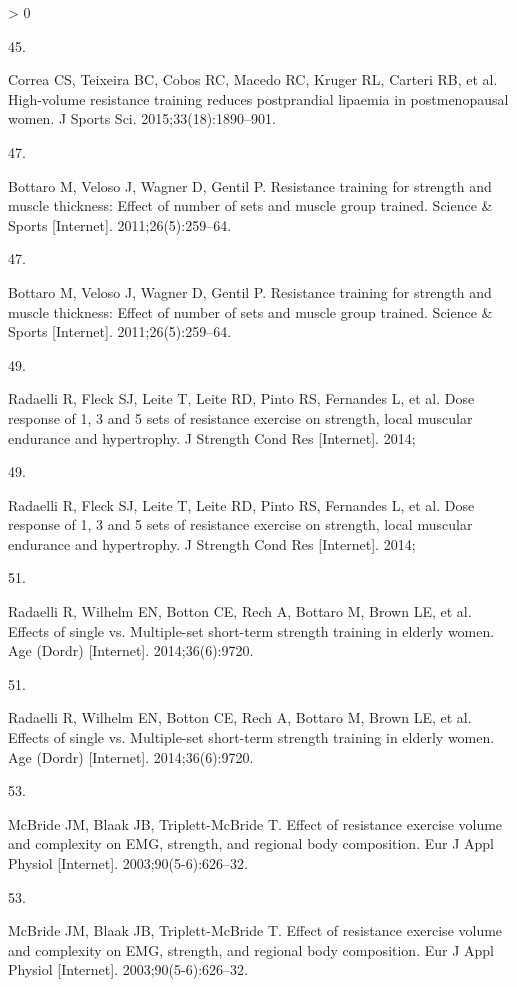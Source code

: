 \documentclass[twoside,10pt]{gihclass} %
\newlength{\cslhangindent}
\newlength{\csllabelwidth}
\newenvironment{CSLReferences}[3] %
 {%
  \setlength{\parindent}{0pt}
  \ifodd #1 \everypar{\setlength{\hangindent}{\cslhangindent}}\ignorespaces\fi
  \ifnum #2 > 0
  \setlength{\parskip}{#2\baselineskip}
  \fi
 }%
 {}
\newcommand{\CSLLeftMargin}[1]{\parbox[t]{\maxof{\widthof{#1}}{\csllabelwidth}}{#1}}
\newcommand{\CSLRightInline}[1]{\parbox[t]{\linewidth}{#1}}
\begin{document}
\begin{CSLReferences}{0}{0}
\leavevmode\hypertarget{ref-RN2464}{}%
\CSLLeftMargin{45. }
\CSLRightInline{Correa CS, Teixeira BC, Cobos RC, Macedo RC, Kruger RL, Carteri RB, et al. High-volume resistance training reduces postprandial lipaemia in postmenopausal women. J Sports Sci. 2015;33(18):1890--901. }

\leavevmode\hypertarget{ref-RN2463}{}%
\CSLLeftMargin{47. }
\CSLRightInline{Bottaro M, Veloso J, Wagner D, Gentil P. Resistance training for strength and muscle thickness: Effect of number of sets and muscle group trained. Science \& Sports {[}Internet{]}. 2011;26(5):259--64. }

\leavevmode\hypertarget{ref-RN2463}{}%
\CSLLeftMargin{47. }
\CSLRightInline{Bottaro M, Veloso J, Wagner D, Gentil P. Resistance training for strength and muscle thickness: Effect of number of sets and muscle group trained. Science \& Sports {[}Internet{]}. 2011;26(5):259--64. }

\leavevmode\hypertarget{ref-RN1570}{}%
\CSLLeftMargin{49. }
\CSLRightInline{Radaelli R, Fleck SJ, Leite T, Leite RD, Pinto RS, Fernandes L, et al. Dose response of 1, 3 and 5 sets of resistance exercise on strength, local muscular endurance and hypertrophy. J Strength Cond Res {[}Internet{]}. 2014; }

\leavevmode\hypertarget{ref-RN1570}{}%
\CSLLeftMargin{49. }
\CSLRightInline{Radaelli R, Fleck SJ, Leite T, Leite RD, Pinto RS, Fernandes L, et al. Dose response of 1, 3 and 5 sets of resistance exercise on strength, local muscular endurance and hypertrophy. J Strength Cond Res {[}Internet{]}. 2014; }

\leavevmode\hypertarget{ref-RN1518}{}%
\CSLLeftMargin{51. }
\CSLRightInline{Radaelli R, Wilhelm EN, Botton CE, Rech A, Bottaro M, Brown LE, et al. Effects of single vs. Multiple-set short-term strength training in elderly women. Age (Dordr) {[}Internet{]}. 2014;36(6):9720. }

\leavevmode\hypertarget{ref-RN1518}{}%
\CSLLeftMargin{51. }
\CSLRightInline{Radaelli R, Wilhelm EN, Botton CE, Rech A, Bottaro M, Brown LE, et al. Effects of single vs. Multiple-set short-term strength training in elderly women. Age (Dordr) {[}Internet{]}. 2014;36(6):9720. }

\leavevmode\hypertarget{ref-RN1474}{}%
\CSLLeftMargin{53. }
\CSLRightInline{McBride JM, Blaak JB, Triplett-McBride T. Effect of resistance exercise volume and complexity on EMG, strength, and regional body composition. Eur J Appl Physiol {[}Internet{]}. 2003;90(5-6):626--32. }

\leavevmode\hypertarget{ref-RN1474}{}%
\CSLLeftMargin{53. }
\CSLRightInline{McBride JM, Blaak JB, Triplett-McBride T. Effect of resistance exercise volume and complexity on EMG, strength, and regional body composition. Eur J Appl Physiol {[}Internet{]}. 2003;90(5-6):626--32. }


\end{CSLReferences}
\end{document}
